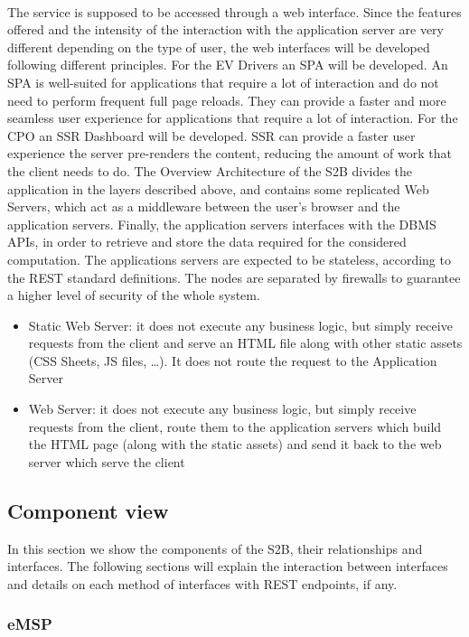 \hfill \\
The service is supposed to be accessed through a web interface.
Since the features offered and the intensity of the interaction with the application server
are very different depending on the type of user, the web interfaces will be developed following
different principles.
For the EV Drivers an SPA will be developed. An SPA is well-suited for applications
that require a lot of interaction and do not need to perform frequent full page reloads.
They can provide a faster and more seamless user experience for applications that require a
lot of interaction.
For the CPO an SSR Dashboard will be developed. SSR can provide a faster user experience
the server pre-renders the content, reducing the amount of work that the client needs to do.
The Overview Architecture of the S2B divides the application in the layers described
above, and contains some replicated Web Servers, which act as a middleware
between the user's browser and the application servers.
Finally, the application servers interfaces with the DBMS APIs, in order
to retrieve and store the data required for the considered computation.
The applications servers are expected to be stateless, according to the
REST standard definitions. The nodes are separated by firewalls to guarantee a higher level of security
of the whole system.

\begin{itemize}
    \item Static Web Server: it does not execute any business logic, but simply receive requests from the client and serve an HTML file along with other static assets (CSS Sheets, JS files, \dots).
          It does not route the request to the Application Server
    \item Web Server: it does not execute any business logic, but simply receive requests from the client, route
          them to the application servers which build the HTML page (along with the static assets) and send it back to the web server which serve the client
\end{itemize}
\pagebreak
\subsection{Component view}
In this section we show the components of the S2B, their relationships and interfaces. The following sections will explain the interaction between interfaces and details on each method of interfaces with REST endpoints, if any.


\subsubsection{eMSP}

